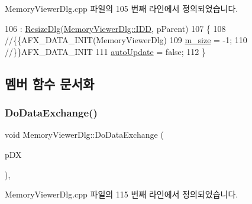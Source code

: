 Memory\+Viewer\+Dlg.\+cpp 파일의 105 번째 라인에서 정의되었습니다.


\begin{DoxyCode}
106   : \mbox{\hyperlink{class_resize_dlg_a87bab778e9312f274ebe750d4c3a67ee}{ResizeDlg}}(\mbox{\hyperlink{class_memory_viewer_dlg_aca9567bd4cf2ec1aa5ac0473ce2d1fa2a7d71336246f22396669425fa2bea86cd}{MemoryViewerDlg::IDD}}, pParent)
107 \{
108   \textcolor{comment}{//\{\{AFX\_DATA\_INIT(MemoryViewerDlg)}
109   \mbox{\hyperlink{class_memory_viewer_dlg_aa24e55d166ddeecb94fea8ab7ad4d836}{m\_size}} = -1;
110   \textcolor{comment}{//\}\}AFX\_DATA\_INIT}
111   \mbox{\hyperlink{class_memory_viewer_dlg_a3ec3d36d4676977f8f37f55ec7f7fb39}{autoUpdate}} = \textcolor{keyword}{false};
112 \}
\end{DoxyCode}


\subsection{멤버 함수 문서화}
\mbox{\label{class_memory_viewer_dlg_aeee7f9087554df8563689ab22facbbd6}} 
\subsubsection{\texorpdfstring{Do\+Data\+Exchange()}{DoDataExchange()}}
{\footnotesize\ttfamily void Memory\+Viewer\+Dlg\+::\+Do\+Data\+Exchange (\begin{DoxyParamCaption}\item[{C\+Data\+Exchange $\ast$}]{p\+DX }\end{DoxyParamCaption})\hspace{0.3cm}{\ttfamily [protected]}, {\ttfamily [virtual]}}



Memory\+Viewer\+Dlg.\+cpp 파일의 115 번째 라인에서 정의되었습니다.


